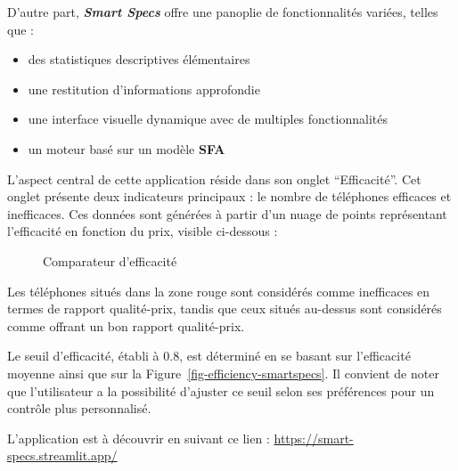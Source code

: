 \documentclass[
  12pt,
]{report}
\providecommand{\tightlist}{%
  \setlength{\itemsep}{0pt}\setlength{\parskip}{0pt}}\usepackage{longtable,booktabs,array}
\renewcommand{\texttt}[1]{\colorbox{light}{\color{highlight}{\ttfamily{#1}}}}
\begin{document}
D'autre part, \textbf{\emph{Smart Specs}} offre une panoplie de
fonctionnalités variées, telles que :

\begin{itemize}
\tightlist
\item
  des statistiques descriptives élémentaires
\item
  une restitution d'informations approfondie
\item
  une interface visuelle dynamique avec de multiples fonctionnalités
\item
  un moteur basé sur un modèle \textbf{SFA}
\end{itemize}

L'aspect central de cette application réside dans son onglet
``Efficacité''. Cet onglet présente deux indicateurs principaux : le
nombre de téléphones efficaces et inefficaces. Ces données sont générées
à partir d'un nuage de points représentant l'efficacité en fonction du
prix, visible ci-dessous :

\begin{figure}[htbp]
    \centering
    \texttt{[image: imgs/graphefficacité.jpg]}
    \caption{Comparateur d'efficacité}
    \label{fig:example}
\end{figure}

Les téléphones situés dans la zone rouge sont considérés comme
inefficaces en termes de rapport qualité-prix, tandis que ceux situés
au-dessus sont considérés comme offrant un bon rapport qualité-prix.

Le seuil d'efficacité, établi à 0.8, est déterminé en se basant sur
l'efficacité moyenne ainsi que sur la
Figure~\ref{fig-efficiency-smartspecs}. Il convient de noter que
l'utilisateur a la possibilité d'ajuster ce seuil selon ses préférences
pour un contrôle plus personnalisé.

\begin{tcolorbox}[enhanced jigsaw, leftrule=.75mm, opacityback=0, bottomtitle=1mm, title=\textcolor{quarto-callout-tip-color}{\faLightbulb}\hspace{0.5em}{Lien de l'application déployée}, colbacktitle=quarto-callout-tip-color!10!white, opacitybacktitle=0.6, coltitle=black, colback=white, left=2mm, breakable, arc=.35mm, toptitle=1mm, titlerule=0mm, toprule=.15mm, rightrule=.15mm, colframe=quarto-callout-tip-color-frame, bottomrule=.15mm]

L'application est à découvrir en suivant ce lien :
\url{https://smart-specs.streamlit.app/}

\end{tcolorbox}
\end{document}
